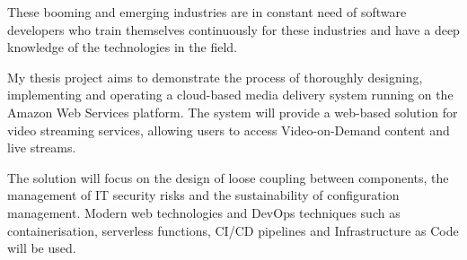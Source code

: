 These booming and emerging industries are in constant need of software developers who train themselves continuously for these industries and have a deep knowledge of the technologies in the field.

My thesis project aims to demonstrate the process of thoroughly designing, implementing and operating a cloud-based media delivery system running on the Amazon Web Services platform. The system will provide a web-based solution for video streaming services, allowing users to access Video-on-Demand content and live streams.

The solution will focus on the design of loose coupling between components, the management of IT security risks and the sustainability of configuration management. Modern web technologies and DevOps techniques such as containerisation, serverless functions, CI/CD pipelines and Infrastructure as Code will be used.

\vfill
\selectthesislanguage

\setcounter{romanPage}{\value{page}}
